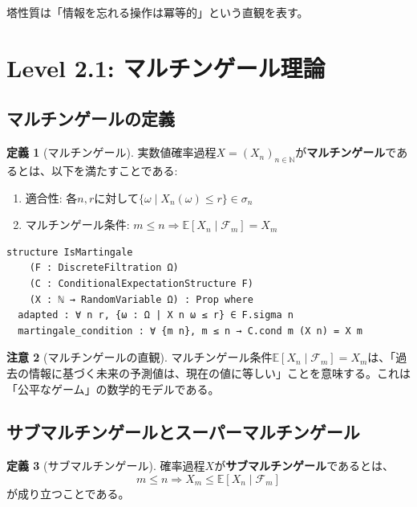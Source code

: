 \documentclass[a4paper,12pt]{ltjsarticle}
\theoremstyle{definition}
\newtheorem{definition}{定義}[section]
\newtheorem{remark}[definition]{注意}
\begin{document}
塔性質は「情報を忘れる操作は冪等的」という直観を表す。

\section{Level 2.1: マルチンゲール理論}

\subsection{マルチンゲールの定義}

\begin{definition}[マルチンゲール]
実数値確率過程$X = (X_n)_{n \in \mathbb{N}}$が\textbf{マルチンゲール}であるとは、以下を満たすことである:
\begin{enumerate}
  \item 適合性: 各$n, r$に対して$\{\omega \mid X_n(\omega) \leq r\} \in \sigma_n$
  \item マルチンゲール条件: $m \leq n \Rightarrow \mathbb{E}[X_n \mid \mathcal{F}_m] = X_m$
\end{enumerate}
\end{definition}

\begin{leanbox}
\begin{verbatim}
structure IsMartingale
    (F : DiscreteFiltration Ω)
    (C : ConditionalExpectationStructure F)
    (X : ℕ → RandomVariable Ω) : Prop where
  adapted : ∀ n r, {ω : Ω | X n ω ≤ r} ∈ F.sigma n
  martingale_condition : ∀ {m n}, m ≤ n → C.cond m (X n) = X m
\end{verbatim}
\end{leanbox}

\begin{remark}[マルチンゲールの直観]
マルチンゲール条件$\mathbb{E}[X_n \mid \mathcal{F}_m] = X_m$は、「過去の情報に基づく未来の予測値は、現在の値に等しい」ことを意味する。これは「公平なゲーム」の数学的モデルである。
\end{remark}

\subsection{サブマルチンゲールとスーパーマルチンゲール}

\begin{definition}[サブマルチンゲール]
確率過程$X$が\textbf{サブマルチンゲール}であるとは、
\[
  m \leq n \Rightarrow X_m \leq \mathbb{E}[X_n \mid \mathcal{F}_m]
\]
が成り立つことである。
\end{definition}
\end{document}
